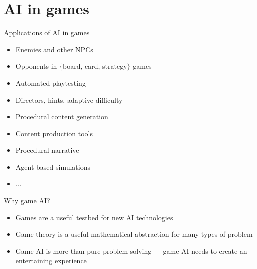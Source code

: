 \newcommand{\pictureslideb}[3]{
	\begin{frame}{#1}
		\begin{center}
			#3
			
			\vspace{6pt}
			
			\texttt{[image: \#2]}
		\end{center}
	\end{frame}
}

\newcommand{\pictureslide}[2]{
	\begin{frame}{#1}
		\begin{center}
			\texttt{[image: \#2]}
		\end{center}
	\end{frame}
}

\part{AI in games}
\frame{\partpage}

\begin{frame}{Applications of AI in games}
	\begin{itemize}
		\pause\item Enemies and other NPCs
		\pause\item Opponents in $\{$board, card, strategy$\}$ games
		\pause\item Automated playtesting
		\pause\item Directors, hints, adaptive difficulty
		\pause\item Procedural content generation
		\pause\item Content production tools
		\pause\item Procedural narrative
		\pause\item Agent-based simulations
		\pause\item ...
	\end{itemize}
\end{frame}

\begin{frame}{Why game AI?}
	\begin{itemize}
		\pause\item Games are a useful testbed for new AI technologies
		\pause\item Game theory is a useful mathematical abstraction for many types of problem
		\pause\item Game AI is more than pure problem solving --- game AI needs to create an entertaining experience
	\end{itemize}
\end{frame}

